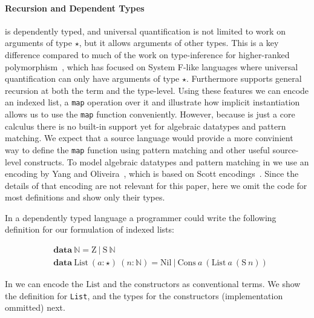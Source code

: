 \paragraph{Recursion and Dependent Types}

\name is dependently typed, and universal quantification is not limited to work
on arguments of type $\star$, but it allows arguments of other types. This is
a key difference compared to much of the work on type-inference for higher-ranked
polymorphism~\cite{}, which has focused on System F-like
languages where universal quantification can only have arguments of type $\star$.
Furthermore \name supports general recursion at both the term and the type-level.
Using these features we can encode an indexed list, a \verb|map| operation over it
and illustrate how implicit instantiation allows us to use the \verb|map| function
conveniently.
However, because \name is just a core calculus there is no built-in support
yet for algebraic datatypes and pattern matching.
We expect that a source language would provide a more convinient
way to define the \verb|map| function using pattern matching and other useful source-level
constructs. To model algebraic datatypes and pattern matching in \name we
use an encoding by Yang and Oliveira~\cite{pits}, which is based on Scott encodings~\cite{}.
Since the details of that encoding are not relevant for this paper,
here we omit the code for most definitions and show only their types.

In a dependently typed language a programmer could write the following definition
for our formulation of indexed lists:


\newcommand{\Nat}[0]{\mathbb{N}}
\newcommand{\Succ}[0]{\mathrm{S}}
\newcommand{\Zero}[0]{\mathrm{Z}}
\newcommand{\List}[0]{\mathrm{List}}
\newcommand{\Nil}[0]{\mathrm{Nil}}
\newcommand{\Cons}[0]{\mathrm{Cons}}
\newcommand{\map}[0]{\mathrm{map}}

\begin{align*}
  & \mathbf{data} ~ \Nat = \Zero ~|~ \Succ~\Nat \\
  & \mathbf{data} ~ \List~(a : \star)~(n : \Nat) = \Nil ~ | ~ \Cons~a~(\List~a~(\Succ~n))
\end{align*}

In \name we can encode the $\mathrm{List}$ and the constructors as conventional terms. We
show the definition for \verb|List|, and the types for the constructors (implementation ommitted)
next.


